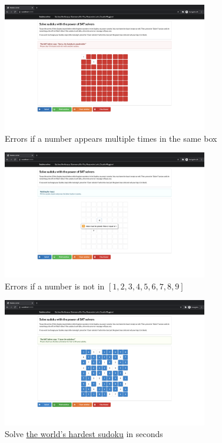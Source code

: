 \documentclass[]{usiinfprospectus}
\begin{document}
\begin{figure}[ht]
\centering
\includegraphics[width=0.8\textwidth]{pics/box_check.png}
\caption{Errors if a number appears multiple times in the same box}
\end{figure}

\begin{figure}[ht]
\centering
\includegraphics[width=0.8\textwidth]{pics/input_check.png}
\caption{Errors if a number is not in $ \left[ 1, 2,3,4,5,6,7,8, 9 \right] $}
\end{figure}

\begin{figure}[ht]
\centering
\includegraphics[width=0.8\textwidth]{pics/hardest_sudoku.png}
\caption{Solve \href{https://www.mirror.co.uk/news/weird-news/worlds-hardest-sudoku-can-you-242294}{the world's hardest sudoku} in seconds}
\end{figure}



\end{document}
